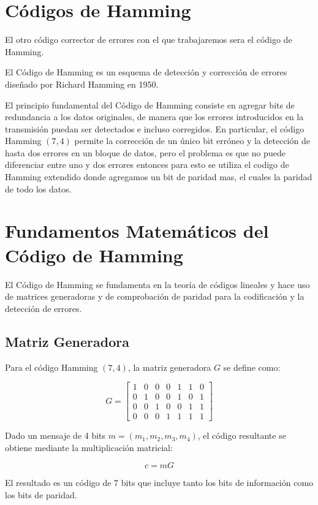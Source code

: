 
\section{Códigos de Hamming} El otro código corrector de errores con el que trabajaremos sera el código de Hamming.

El Código de Hamming es un esquema de detección y corrección de errores diseñado por Richard Hamming en 1950.

El principio fundamental del Código de Hamming consiste en agregar bits de redundancia a los datos originales, de manera que los errores introducidos en la transmisión puedan ser detectados e incluso corregidos. En particular, el código Hamming $(7,4)$ permite la corrección de un único bit erróneo y la detección de hasta dos errores en un bloque de datos, pero el problema es que no puede diferenciar entre uno y dos errores entonces para esto se utiliza el codigo de Hamming extendido donde agregamos un bit de paridad mas, el cuales la paridad de todo los datos.

\section{Fundamentos Matemáticos del Código de Hamming}

El Código de Hamming se fundamenta en la teoría de códigos lineales y hace uso de matrices generadoras y de comprobación de paridad para la codificación y la detección de errores.

\subsection{Matriz Generadora}

Para el código Hamming $(7,4)$, la matriz generadora $G$ se define como:

\[
G = \begin{bmatrix}
1 & 0 & 0 & 0 & 1 & 1 & 0 \\
0 & 1 & 0 & 0 & 1 & 0 & 1 \\
0 & 0 & 1 & 0 & 0 & 1 & 1 \\
0 & 0 & 0 & 1 & 1 & 1 & 1
\end{bmatrix}
\]

Dado un mensaje de 4 bits $m = (m_1, m_2, m_3, m_4)$, el código resultante se obtiene mediante la multiplicación matricial:

\[
c = m G
\]

El resultado es un código de 7 bits que incluye tanto los bits de información como los bits de paridad.

